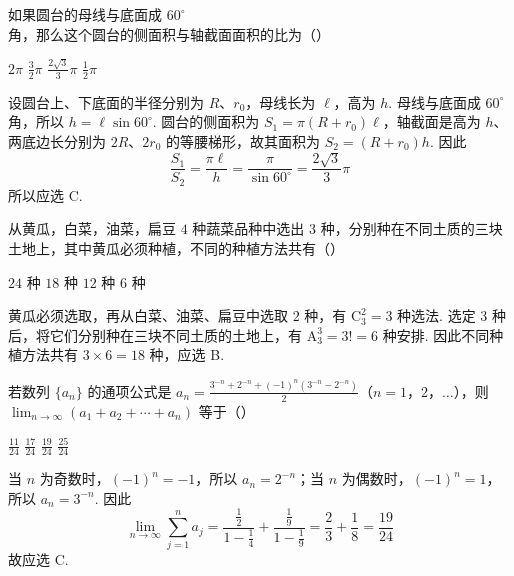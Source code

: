 \begin{problem}
如果圆台的母线与底面成 \(60^{\circ}\) 角，那么这个圆台的侧面积与轴截面面积的比为（\quad）

\choices
    {\(2\pi\)}
    {\(\frac{3}{2}\pi\)}
    {\(\frac{2\sqrt{3}}{3}\pi\)}
    {\(\frac{1}{2}\pi\)}

\begin{solution}
设圆台上、下底面的半径分别为 \(R\)、\(r_0\)，母线长为 \(\ell\)，高为 \(h\). 母线与底面成 \(60^{\circ}\) 角，所以 \(h=\ell\sin60^{\circ}\). 圆台的侧面积为 \(S_1=\pi(R+r_0)\ell\)，轴截面是高为 \(h\)、两底边长分别为 \(2R\)、\(2r_0\) 的等腰梯形，故其面积为 \(S_2=(R+r_0)h\). 因此
\[
\frac{S_1}{S_2}=\frac{\pi\ell}{h}=\frac{\pi}{\sin60^{\circ}}=\frac{2\sqrt3}{3}\pi
\]
所以应选 C.
\end{solution}
\end{problem}

\begin{problem}
从黄瓜，白菜，油菜，扁豆 \(4\text{ 种}\)蔬菜品种中选出 \(3\text{ 种}\)，分别种在不同土质的三块土地上，其中黄瓜必须种植，不同的种植方法共有（\quad）

\choices
    {\(24\text{ 种}\)}
    {\(18\text{ 种}\)}
    {\(12\text{ 种}\)}
    {\(6\text{ 种}\)}

\begin{solution}
黄瓜必须选取，再从白菜、油菜、扁豆中选取 \(2\) 种，有 \(\mathrm C_3^2=3\) 种选法. 选定 \(3\) 种后，将它们分别种在三块不同土质的土地上，有 \(\mathrm A_3^3=3!=6\) 种安排. 因此不同种植方法共有 \(3\times6=18\) 种，应选 B.
\end{solution}
\end{problem}

\begin{problem}
若数列 \(\{a_n\}\) 的通项公式是
\(a_n=\frac{3^{-n}+2^{-n}+(-1)^n\left(3^{-n}-2^{-n}\right)}{2}\)（\(n=1\)，\(2\)，\(\dots\)），则 \(\displaystyle\lim_{n\to\infty}(a_1+a_2+\cdots+a_n)\) 等于（\quad）

\choices
    {\(\frac{11}{24}\)}
    {\(\frac{17}{24}\)}
    {\(\frac{19}{24}\)}
    {\(\frac{25}{24}\)}

\begin{solution}
当 \(n\) 为奇数时，\((-1)^n=-1\)，所以 \(a_n=2^{-n}\)；当 \(n\) 为偶数时，\((-1)^n=1\)，所以 \(a_n=3^{-n}\). 因此
\[
\lim_{n\to\infty}\sum_{j=1}^{n}a_j
=\frac{\frac12}{1-\frac14}+\frac{\frac19}{1-\frac19}
=\frac23+\frac18=\frac{19}{24}
\]
故应选 C.
\end{solution}
\end{problem}

